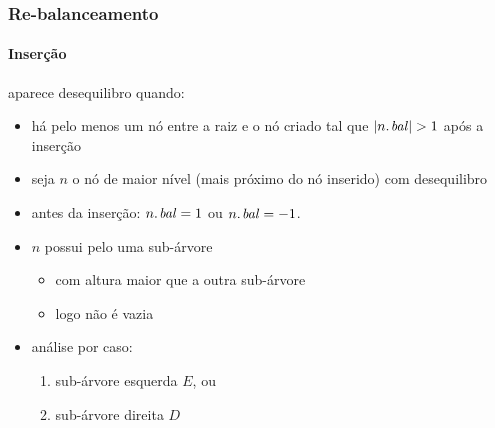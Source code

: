 \documentclass{beamer}
\begin{document}
\begin{frame}

\frametitle{Re-balanceamento}
\framesubtitle{Inserção}

aparece desequilibro quando:

\begin{itemize}

\item há pelo menos um nó entre a raiz e o nó criado tal que $\left|\attrib{n}{bal}\right| > 1$ após a inserção

\item seja $n$ o nó de maior nível (mais próximo do nó inserido) com
desequilibro

\item antes da inserção: $\attrib{n}{bal} = 1$ ou $\attrib{n}{bal} = -1$.

\item $n$ possui pelo uma sub-árvore 

  \begin{itemize}

    \item com altura maior que a outra sub-árvore

    \item logo não é vazia

  \end{itemize}

\item análise por caso: 

  \begin{enumerate}

  \item sub-árvore esquerda $E$, ou

  \item sub-árvore direita $D$

  \end{enumerate}

\end{itemize}

\end{frame}
\end{document}
